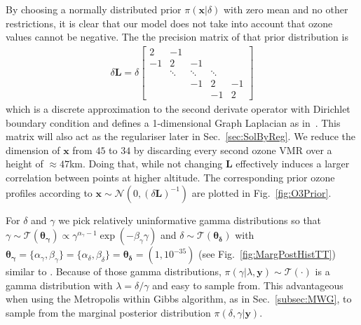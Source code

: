 By choosing a normally distributed prior $\pi(\bm{x}|\delta)$ with zero mean and no other restrictions, it is clear that our model does not take into account that ozone values cannot be negative.
The the precision matrix of that prior distribution is
\begin{align}
	\delta \bm{L} =
	\delta
	\begin{bmatrix}
		2 & -1 & & &  \\
		-1 & 2 & -1 & &   \\
		& \ddots & \ddots & \ddots &\\ 
		& & -1 & 2 & -1  \\
		& & & -1 & 2 
	\end{bmatrix} 
	\label{eq:GLapl} 
\end{align}
which is a discrete approximation to the second derivate operator with Dirichlet boundary condition and defines a 1-dimensional Graph Laplacian as in~\cite{wang2015graphs, fox2016fast}.
This matrix will also act as the regulariser later in Sec.~\ref{sec:SolByReg}.
We reduce the dimension of $\bm{x}$ from $45$ to $34$ by discarding every second ozone VMR over a height of $\approx47$km.
Doing that, while not changing $\bm{L}$ effectively induces a larger correlation between points at higher altitude.
The corresponding prior ozone profiles according to $\bm{x}\sim \mathcal{N}(0, (\delta \bm{L})^{-1})$ are plotted in Fig.~\ref{fig:O3Prior}.

For $\delta$ and $\gamma$ we pick relatively uninformative gamma distributions so that \linebreak$\gamma \sim \mathcal{T}(\bm{\theta_{\gamma}}) \propto \gamma^{\alpha_\gamma -1 } \exp{( -\beta_\gamma \gamma) } $ and $\delta \sim \mathcal{T}(\bm{\theta_{\delta}})$ with $\bm{\theta_{\gamma}} = \{  \alpha_\gamma, \beta_\gamma\}  = \{ \alpha_\delta ,\beta_\delta\} = \bm{\theta_{\delta}} = (1,10^{-35})$ (see Fig.~\ref{fig:MargPostHistTT}) similar to \cite{fox2016fast}.
Because of those gamma distributions, $\pi(\gamma | \lambda, \bm{y}) \sim \mathcal{T}(\cdot)$ is a gamma distribution with $\lambda = \delta / \gamma $ and easy to sample from.
This advantageous when using the Metropolis within Gibbs algorithm, as in Sec.~\ref{subsec:MWG}, to sample from the marginal posterior distribution $\pi(\delta, \gamma | \bm{y})$.
\clearpage
